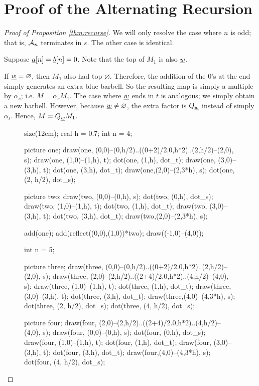 \section{Proof of the Alternating Recursion}
\label{sec:recurse_proof}
\recurse*
\begin{proof}[Proof of Proposition \ref{thm:recurse}]
	We will only resolve the case where $n$ is odd; that is, $\AA_n$ terminates in $s$.  The other case is identical.
	\begin{enumerate}[(i)]
		\ii Suppose $\ul a[n] = \ul b[n] = 0$.  Note that the top of $M_1$ is also $\ul w$.
		\begin{itemize}
			\ii If $\ul w = \varnothing$, then $M_1$ also had top $\varnothing$.  Therefore, the addition of the $0$'s at the end simply generates an extra blue barbell.  So the resulting map is simply a multiple by $\alpha_s$; i.e. $M = \alpha_sM_1$.
			\ii The case where $\ul w$ ends in $t$ is analogous; we simply obtain a new barbell.  However, because $\ul w \neq \varnothing$, the extra factor is $Q_{\ul w}$ instead of simply $\alpha_t$.  Hence, $M = Q_{\ul w}M_1$.
			\begin{figure}[ht]
				\centering
				\begin{asy}
					size(12cm);
					real h = 0.7;
					int n = 4;

					picture one;
					draw(one, (0,0)--(0,h/2)..((0+2)/2.0,h*2)..(2,h/2)--(2,0), s);
					draw(one, (1,0)--(1,h), t);
					dot(one, (1,h), dot_t);
					draw(one, (3,0)--(3,h), t);
					dot(one, (3,h), dot_t);
					draw(one,(2,0)--(2,3*h), s);
					dot(one, (2, h/2), dot_s);

					picture two;
					draw(two, (0,0)--(0,h), s);
					dot(two, (0,h), dot_s);
					draw(two, (1,0)--(1,h), t);
					dot(two, (1,h), dot_t);
					draw(two, (3,0)--(3,h), t);
					dot(two, (3,h), dot_t);
					draw(two,(2,0)--(2,3*h), s);

					add(one); add(reflect((0,0),(1,0))*two);
					draw((-1,0)--(4,0));

					int n = 5;

					picture three;
					draw(three, (0,0)--(0,h/2)..((0+2)/2.0,h*2)..(2,h/2)--(2,0), s);
					draw(three, (2,0)--(2,h/2)..((2+4)/2.0,h*2)..(4,h/2)--(4,0), s);
					draw(three, (1,0)--(1,h), t);
					dot(three, (1,h), dot_t);
					draw(three, (3,0)--(3,h), t);
					dot(three, (3,h), dot_t);
					draw(three,(4,0)--(4,3*h), s);
					dot(three, (2, h/2), dot_s);
					dot(three, (4, h/2), dot_s);

					picture four;
					draw(four, (2,0)--(2,h/2)..((2+4)/2.0,h*2)..(4,h/2)--(4,0), s);
					draw(four, (0,0)--(0,h), s);
					dot(four, (0,h), dot_s);
					draw(four, (1,0)--(1,h), t);
					dot(four, (1,h), dot_t);
					draw(four, (3,0)--(3,h), t);
					dot(four, (3,h), dot_t);
					draw(four,(4,0)--(4,3*h), s);
					dot(four, (4, h/2), dot_s);


\end{asy}
\end{figure}
\end{itemize}
\end{enumerate}
\end{proof}
